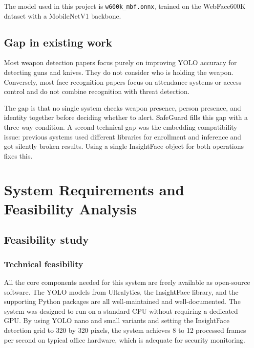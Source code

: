 \documentclass[12pt,a4paper]{report}
\begin{document}
The model used in this project is \texttt{w600k\_mbf.onnx}, trained on the WebFace600K dataset with a MobileNetV1 backbone.

\section{Gap in existing work}

Most weapon detection papers focus purely on improving YOLO accuracy for detecting guns and knives. They do not consider who is holding the weapon. Conversely, most face recognition papers focus on attendance systems or access control and do not combine recognition with threat detection.

The gap is that no single system checks weapon presence, person presence, and identity together before deciding whether to alert. SafeGuard fills this gap with a three-way condition. A second technical gap was the embedding compatibility issue: previous systems used different libraries for enrollment and inference and got silently broken results. Using a single InsightFace object for both operations fixes this.


\chapter{System Requirements and Feasibility Analysis}

\section{Feasibility study}

\subsection{Technical feasibility}

All the core components needed for this system are freely available as open-source software. The YOLO models from Ultralytics, the InsightFace library, and the supporting Python packages are all well-maintained and well-documented. The system was designed to run on a standard CPU without requiring a dedicated GPU. By using YOLO nano and small variants and setting the InsightFace detection grid to 320 by 320 pixels, the system achieves 8 to 12 processed frames per second on typical office hardware, which is adequate for security monitoring.
\end{document}
